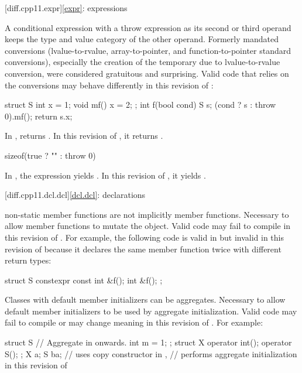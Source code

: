 [diff.cpp11.expr]{\ref{expr}: expressions}

\change
A conditional expression with a throw expression as its second or third
operand keeps the type and value category of the other operand.
\rationale
Formerly mandated conversions (lvalue-to-rvalue,
array-to-pointer, and function-to-pointer
standard conversions), especially the creation of the temporary due to
lvalue-to-rvalue conversion, were considered gratuitous and surprising.
\effect
Valid \CppXI{} code that relies on the conversions may behave differently
in this revision of \Cpp{}:

\begin{codeblock}
struct S {
  int x = 1;
  void mf() { x = 2; }
};
int f(bool cond) {
  S s;
  (cond ? s : throw 0).mf();
  return s.x;
}
\end{codeblock}

In \CppXI{},  returns . In this revision of \Cpp{},
it returns .

\begin{codeblock}
sizeof(true ? "" : throw 0)
\end{codeblock}

In \CppXI{}, the expression yields . In this
revision of \Cpp{}, it yields .

[diff.cpp11.dcl.dcl]{\ref{dcl.dcl}: declarations}

\change
{} non-static member functions are not implicitly
 member functions.
\rationale
Necessary to allow  member functions to mutate
the object.
\effect
Valid \CppXI{} code may fail to compile in this revision of \Cpp{}.
For example, the following code is valid in \CppXI{}
but invalid in this revision of \Cpp{} because it declares the same member
function twice with different return types:
\begin{codeblock}
struct S {
  constexpr const int &f();
  int &f();
};
\end{codeblock}

\change
Classes with default member initializers can be aggregates.
\rationale
Necessary to allow default member initializers to be used
by aggregate initialization.
\effect
Valid \CppXI{} code may fail to compile or may change meaning in this revision of \Cpp{}.
For example:
\begin{codeblock}
struct S {          // Aggregate in \CppXIV{} onwards.
  int m = 1;
};
struct X {
  operator int();
  operator S();
};
X a{};
S b{a};             // uses copy constructor in \CppXI{},
                    // performs aggregate initialization in this revision of \Cpp{}
\end{codeblock}

